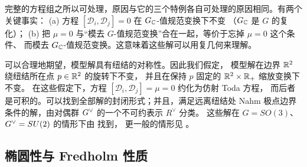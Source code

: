 
完整的方程组之所以可处理，原因与它的三个特例各自可处理的原因相同。有两个关键事实：
(a) 方程 $[\mathcal{D}_i,\mathcal{D}_j]=0$ 在 $G_{\mathbb{C}}$-值规范变换下不变
（$G_{\mathbb{C}}$ 是 $G$ 的复化）；
(b) 把 $\mu=0$ 与“模去 $G$-值规范变换”合在一起，等价于忘掉 $\mu=0$ 这个条件、
而模去 $G_{\mathbb{C}}$-值规范变换。这意味着这些解可以用复几何来理解。


可以合理地期望，模型解具有纽结的对称性。因此我们假定，
模型解在边界 $\mathbb{R}^2$ 绕纽结所在点 $p\in\mathbb{R}^2$ 的旋转下不变，
并且在保持 $p$ 固定的 $\mathbb{R}^2\times\mathbb{R}_+$ 缩放变换下不变。
在这些假定下，方程 $[\mathcal{D}_i,\mathcal{D}_j]=\mu=0$ 约化为仿射 Toda 方程，
而后者是可积的。可以找到全部解的封闭形式；并且，满足远离纽结处
Nahm 极点边界条件的解，由对偶群 $G^{\vee}$ 的一个不可约表示 $R^{\vee}$ 分类。
这些解在 $G=SO(3)$、$G^{\vee}=SU(2)$ 的情形下由 \cite{W5branes} 找到，
更一般的情形见 \cite{Mikhaylov}。



\subsection{椭圆性与 Fredholm 性质}

